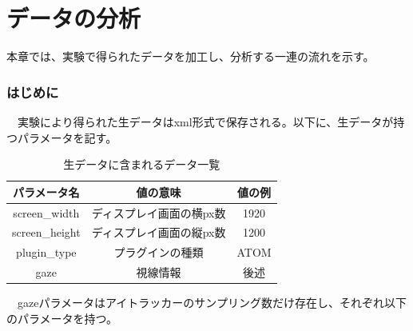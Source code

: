 \documentclass[paper=a4paper,fontsize=10pt]{jlreq}
\begin{document}
\clearpage

\part{データの分析}
  本章では、実験で得られたデータを加工し、分析する一連の流れを示す。

  \section{はじめに}
  　実験により得られた生データはxml形式で保存される。以下に、生データが持つパラメータを記す。\\
    \begin{table}[h]
      \centering
      \caption{生データに含まれるデータ一覧}
      \begin{tabular}{|c|c|c|}
        \hline
        パラメータ名 & 値の意味 & 値の例 \\ \hline
        screen\_width & ディスプレイ画面の横px数 & 1920 \\ \hline
        screen\_height & ディスプレイ画面の縦px数 & 1200 \\ \hline
        plugin\_type & プラグインの種類 & ATOM \\ \hline
        gaze & 視線情報 & 後述 \\ \hline
      \end{tabular}
      \label{tab:basic}
    \end{table}
   \FloatBarrier

  　gazeパラメータはアイトラッカーのサンプリング数だけ存在し、それぞれ以下のパラメータを持つ。
\end{document}
